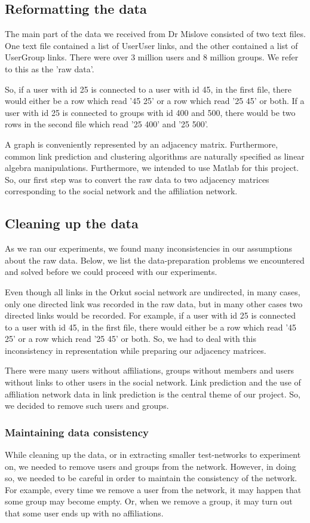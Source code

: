 \documentclass{report}
\begin{document}
\subsection{Reformatting the data}
The main part of the data we received from Dr Mislove consisted of two text files. One text file contained a list of UserUser links, and the other contained a list of UserGroup links. There were over 3 million users and 8 million groups. We refer to this as the 'raw data'.

So, if a user with id 25 is connected to a user with id 45, in the first file, there would either be a row which read '45 25' or a row which read '25 45' or both. If a user with id 25 is connected to groups with id 400 and 500, there would be two rows in the second file which read '25 400' and '25 500'.

A graph is conveniently represented by an adjacency matrix. Furthermore, common link prediction and clustering algorithms are naturally specified as linear algebra manipulations. Furthermore, we intended to use Matlab for this project. So, our first step was to convert the raw data to two adjacency matrices corresponding to the social network and the affiliation network.

\subsection{Cleaning up the data}
As we ran our experiments, we found many inconsistencies in our assumptions about the raw data. Below, we list the data-preparation problems we encountered and solved before we could proceed with our experiments.

Even though all links in the Orkut social network are undirected, in many cases, only one directed link was recorded in the raw data, but in many other cases two directed links would be recorded. For example, if a user with id 25 is connected to a user with id 45, in the first file, there would either be a row which read '45 25' or a row which read '25 45' or both. So, we had to deal with this inconsistency in representation while preparing our adjacency matrices.

There were many users without affiliations, groups without members and users without links to other users in the social network. Link prediction and the use of affiliation network data in link prediction is the central theme of our project. So, we decided to remove such users and groups.

\subsubsection{Maintaining data consistency}
While cleaning up the data, or in extracting smaller test-networks to experiment on, we needed to remove users and groups from the network. However, in doing so, we needed to be careful in order to maintain the consistency of the network. For example, every time we remove a user from the network, it may happen that some group may become empty. Or, when we remove a group, it may turn out that some user ends up with no affiliations.
\end{document}
